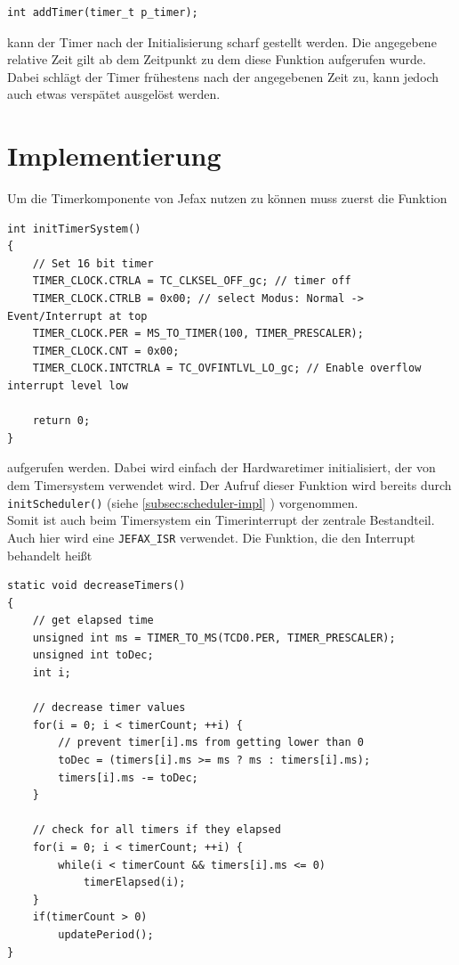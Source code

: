 \documentclass[fontsize=12pt, toc=bibliography, notitlepage]{scrreprt}
\newcommand{\refnn}[1]{\ref{#1} \nameref{#1}}
\begin{document}
\begin{lstlisting}
int addTimer(timer_t p_timer);
\end{lstlisting}

kann der Timer nach der Initialisierung scharf gestellt werden. Die angegebene relative Zeit gilt ab dem Zeitpunkt zu dem diese Funktion aufgerufen wurde. Dabei schlägt der Timer frühestens nach der angegebenen Zeit zu, kann jedoch auch etwas verspätet ausgelöst werden.

\section{Implementierung}
\label{sec:timer-impl}
Um die Timerkomponente von Jefax nutzen zu können muss zuerst die Funktion

\begin{lstlisting}[title=timer.c]
int initTimerSystem()
{
	// Set 16 bit timer
	TIMER_CLOCK.CTRLA = TC_CLKSEL_OFF_gc; // timer off
	TIMER_CLOCK.CTRLB = 0x00; // select Modus: Normal -> Event/Interrupt at top
	TIMER_CLOCK.PER = MS_TO_TIMER(100, TIMER_PRESCALER);
	TIMER_CLOCK.CNT = 0x00;
	TIMER_CLOCK.INTCTRLA = TC_OVFINTLVL_LO_gc; // Enable overflow interrupt level low
	
	return 0;
}
\end{lstlisting}

aufgerufen werden. Dabei wird einfach der Hardwaretimer initialisiert, der von dem Timersystem verwendet wird. Der Aufruf dieser Funktion wird bereits durch \lstinline$initScheduler()$ (siehe \refnn{subsec:scheduler-impl}) vorgenommen.\\

Somit ist auch beim Timersystem ein Timerinterrupt der zentrale Bestandteil. Auch hier wird eine \lstinline$JEFAX_ISR$ verwendet. Die Funktion, die den Interrupt behandelt heißt

\begin{lstlisting}[title=timer.c]
static void decreaseTimers()
{
	// get elapsed time
	unsigned int ms = TIMER_TO_MS(TCD0.PER, TIMER_PRESCALER);
	unsigned int toDec;
	int i;
	
	// decrease timer values
	for(i = 0; i < timerCount; ++i) {
		// prevent timer[i].ms from getting lower than 0
		toDec = (timers[i].ms >= ms ? ms : timers[i].ms);
		timers[i].ms -= toDec;
	}
	
	// check for all timers if they elapsed
	for(i = 0; i < timerCount; ++i) {
		while(i < timerCount && timers[i].ms <= 0)
			timerElapsed(i);
	}
	if(timerCount > 0)
		updatePeriod();
}
\end{lstlisting}
\end{document}
